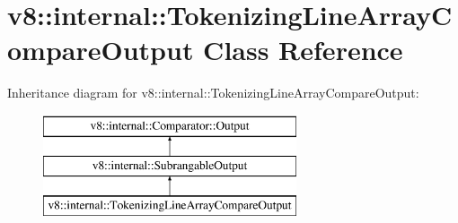 \hypertarget{classv8_1_1internal_1_1_tokenizing_line_array_compare_output}{}\section{v8\+:\+:internal\+:\+:Tokenizing\+Line\+Array\+Compare\+Output Class Reference}
\label{classv8_1_1internal_1_1_tokenizing_line_array_compare_output}
Inheritance diagram for v8\+:\+:internal\+:\+:Tokenizing\+Line\+Array\+Compare\+Output\+:\begin{figure}[H]
\begin{center}
\leavevmode
\includegraphics[height=3.000000cm]{classv8_1_1internal_1_1_tokenizing_line_array_compare_output}
\end{center}
\end{figure}
